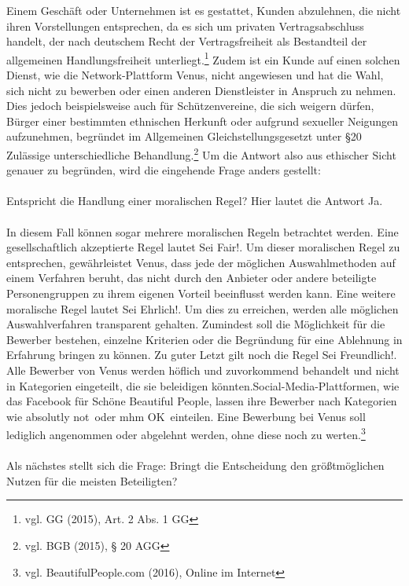 Einem Geschäft oder Unternehmen ist es gestattet, Kunden abzulehnen, die nicht ihren Vorstellungen entsprechen, da es sich um privaten Vertragsabschluss handelt, der nach deutschem Recht der Vertragsfreiheit als Bestandteil der allgemeinen Handlungsfreiheit unterliegt.\footnote{vgl. GG (2015), Art. 2 Abs. 1 GG} Zudem ist ein Kunde auf einen solchen Dienst, wie die Network-Plattform Venus, nicht angewiesen und hat die Wahl, sich nicht zu bewerben oder einen anderen Dienstleister in Anspruch zu nehmen. Dies jedoch beispielsweise auch für Schützenvereine, die sich weigern dürfen, Bürger einer bestimmten ethnischen Herkunft oder aufgrund sexueller Neigungen aufzunehmen, begründet im Allgemeinen Gleichstellungsgesetzt unter §20 \glqq Zulässige unterschiedliche Behandlung\grqq.\footnote{vgl. BGB (2015), § 20 AGG} Um die Antwort also aus ethischer Sicht genauer zu begründen, wird die eingehende Frage anders gestellt:\\
\\
Entspricht die Handlung einer moralischen Regel? Hier lautet die Antwort \glqq Ja\grqq.\\
\\
In diesem Fall können sogar mehrere moralischen Regeln betrachtet werden. Eine gesellschaftlich akzeptierte Regel lautet \glqq Sei Fair!\grqq. Um dieser moralischen Regel zu entsprechen, gewährleistet Venus, dass jede der möglichen Auswahlmethoden auf einem Verfahren beruht, das nicht durch den Anbieter oder andere beteiligte Personengruppen zu ihrem eigenen Vorteil beeinflusst werden kann. Eine weitere moralische Regel lautet \glqq Sei Ehrlich!\grqq. Um dies zu erreichen, werden alle möglichen Auswahlverfahren transparent gehalten. Zumindest soll die Möglichkeit für die Bewerber bestehen, einzelne Kriterien oder die Begründung für eine Ablehnung in Erfahrung bringen zu können. Zu guter Letzt gilt noch die Regel \glqq Sei Freundlich!\grqq. Alle Bewerber von Venus werden höflich und zuvorkommend behandelt und nicht in Kategorien eingeteilt, die sie beleidigen könnten.Social-Media-Plattformen, wie das Facebook für Schöne \glqq Beautiful People\grqq, lassen ihre Bewerber nach Kategorien wie \glqq absolutly not\grqq~oder \glqq mhm OK\grqq~einteilen. Eine Bewerbung bei Venus soll lediglich angenommen oder abgelehnt werden, ohne diese noch zu werten.\footnote{vgl. BeautifulPeople.com (2016), Online im Internet}\\
\\ 
Als nächstes stellt sich die Frage: Bringt die Entscheidung den größtmöglichen Nutzen für die meisten Beteiligten?\\
